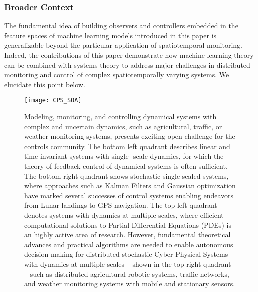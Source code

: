 \subsubsection*{Broader Context}
The fundamental idea of building observers and controllers embedded in the feature spaces of machine learning models introduced in this paper is generalizable beyond the particular application of spatiotemporal monitoring. Indeed, the contributions of this paper demonstrate how machine learning theory can be combined with systems theory to address major challenges in distributed monitoring and control of complex spatiotemporally varying systems. We elucidate this point below.

\begin{figure}[h] %
	\centering
	\texttt{[image: CPS\_SOA]}
		\caption{Modeling, monitoring, and controlling dynamical systems with complex and uncertain dynamics, such as agricultural, traffic, or weather monitoring systems, presents exciting open challenge for the controls community. The bottom left quadrant describes linear and time-invariant systems with single- scale dynamics, for which the theory of feedback control of dynamical systems is often sufficient. The bottom right quadrant shows stochastic single-scaled systems, where approaches such as Kalman Filters and Gaussian optimization have marked several successes of control systems enabling endeavors from Lunar landings to GPS navigation. The top left quadrant denotes systems with dynamics at multiple scales, where efficient computational solutions to Partial Differential Equations (PDEs) is an highly active area of research. However, fundamental theoretical advances and practical algorithms are needed to enable autonomous decision making for distributed stochastic Cyber Physical Systems with dynamics at multiple scales – shown in the top right quadrant – such as distributed agricultural robotic systems, traffic networks, and weather monitoring systems with mobile and stationary sensors.}
	\label{fig:cps_soa}
\end{figure}
  
